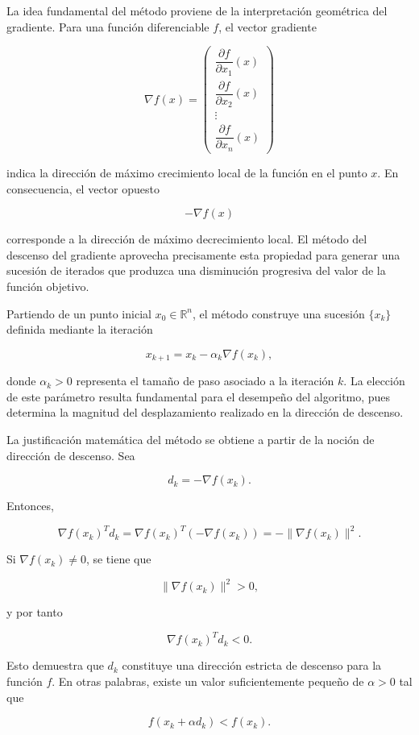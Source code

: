 \documentclass[
  spanish,
  us-letterpaper,
  DIV=11,
  numbers=noendperiod]{scrreprt}
\begin{document}
La idea fundamental del método proviene de la interpretación geométrica
del gradiente. Para una función diferenciable \(f\), el vector gradiente

\[
\nabla f(x)
=
\begin{pmatrix}
\dfrac{\partial f}{\partial x_1}(x) \\
\dfrac{\partial f}{\partial x_2}(x) \\
\vdots \\
\dfrac{\partial f}{\partial x_n}(x)
\end{pmatrix}
\]

indica la dirección de máximo crecimiento local de la función en el
punto \(x\). En consecuencia, el vector opuesto

\[
-\nabla f(x)
\]

corresponde a la dirección de máximo decrecimiento local. El método del
descenso del gradiente aprovecha precisamente esta propiedad para
generar una sucesión de iterados que produzca una disminución progresiva
del valor de la función objetivo.

Partiendo de un punto inicial \(x_0 \in \mathbb{R}^n\), el método
construye una sucesión \(\{x_k\}\) definida mediante la iteración

\[
x_{k+1}
=
x_k - \alpha_k \nabla f(x_k),
\]

donde \(\alpha_k > 0\) representa el tamaño de paso asociado a la
iteración \(k\). La elección de este parámetro resulta fundamental para
el desempeño del algoritmo, pues determina la magnitud del
desplazamiento realizado en la dirección de descenso.

La justificación matemática del método se obtiene a partir de la noción
de dirección de descenso. Sea

\[
d_k = -\nabla f(x_k).
\]

Entonces,

\[
\nabla f(x_k)^T d_k
=
\nabla f(x_k)^T(-\nabla f(x_k))
=
-\|\nabla f(x_k)\|^2.
\]

Si \(\nabla f(x_k)\neq 0\), se tiene que

\[
\|\nabla f(x_k)\|^2 > 0,
\]

y por tanto

\[
\nabla f(x_k)^T d_k < 0.
\]

Esto demuestra que \(d_k\) constituye una dirección estricta de descenso
para la función \(f\). En otras palabras, existe un valor
suficientemente pequeño de \(\alpha > 0\) tal que

\[
f(x_k+\alpha d_k) < f(x_k).
\]
\end{document}
